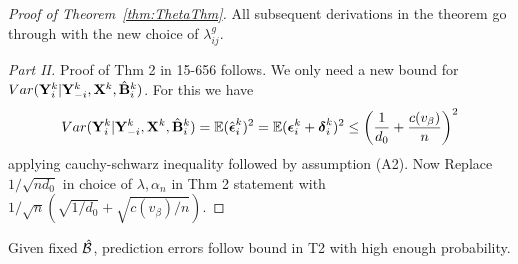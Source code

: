 \documentclass[fleqn,11pt]{article}
\numberwithin{equation}{section}
\begin{document}
\begin{proof}[Proof of Theorem~\ref{thm:ThetaThm}]
All subsequent derivations in the theorem go through with the new choice of $\lambda_{ij}^g$.

%
%
%

\textit{Part II.} Proof of Thm 2 in 15-656 follows. We only need a new bound for $Var ({\mathbf{Y}}_i^k | {\mathbf{Y}}_{-i}^k, {\mathbf{X}}^k, \hat {{\mathbf{B}}}_i^k)$. For this we have
%
$$ Var ({\mathbf{Y}}_i^k | {\mathbf{Y}}_{-i}^k, {\mathbf{X}}^k, \hat {{\mathbf{B}}}_i^k) = {\mathbb{E}} (\hat {{\boldsymbol{\epsilon}}}_i^k)^2
= {\mathbb{E}} ( {\boldsymbol{\epsilon}}_i^k + {\boldsymbol{\delta}}_i^k)^2
\leq \left( \frac{1}{d_0} + \frac{c(v_\beta)}{n} \right)^2
$$
%
applying cauchy-schwarz inequality followed by assumption (A2). Now Replace $1/\sqrt{n d_0}$ in choice of $\lambda, \alpha_n$ in Thm 2 statement with $1/\sqrt{n} (\sqrt{1/d_0} + \sqrt{c(v_\beta)/ n})$.

\end{proof}

\begin{Proposition}
Given fixed $\hat {{\cal{B}}}$, prediction errors follow bound in T2 with high enough probability.
\end{Proposition}


%

\end{document}
